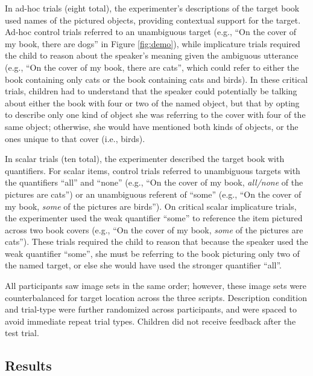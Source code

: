 \documentclass[man]{apa2}
\begin{document}
In ad-hoc trials (eight total), the experimenter's descriptions of the target book used names of the pictured objects, providing contextual support for the target. Ad-hoc control trials referred to an unambiguous target (e.g., ``On the cover of my book, there are dogs'' in Figure \ref{fig:demo}), while implicature trials required the child to reason about the speaker's meaning given the ambiguous utterance (e.g., ``On the cover of my book, there are cats'', which could refer to either the book containing only cats or the book containing cats and birds). In these critical trials, children had to understand that the speaker could potentially be talking about either the book with four or two of the named object, but that by opting to describe only one kind of object she was referring to the cover with four of the same object; otherwise, she would have mentioned both kinds of objects, or the ones unique to that cover (i.e., birds). 

In scalar trials (ten total), the experimenter described the target book with quantifiers. For scalar items, control trials referred to unambiguous targets with the quantifiers ``all'' and ``none'' (e.g., ``On the cover of my book, \textit{all/none} of the pictures are cats'') or an unambiguous referent of ``some'' (e.g., ``On the cover of my book, \textit{some} of the pictures are birds''). On critical scalar implicature trials, the experimenter used the weak quantifier ``some'' to reference the item pictured across two book covers (e.g., ``On the cover of my book, \textit{some} of the pictures are cats''). These trials required the child to reason that because the speaker used the weak quantifier ``some'', she must be referring to the book picturing only two of the named target, or else she would have used the stronger quantifier ``all''. 

All participants saw image sets in the same order; however, these image sets were counterbalanced for target location across the three scripts. Description condition and trial-type were further randomized across participants, and were spaced to avoid immediate repeat trial types. Children did not receive feedback after the test trial.

\subsection{Results}
\end{document}
